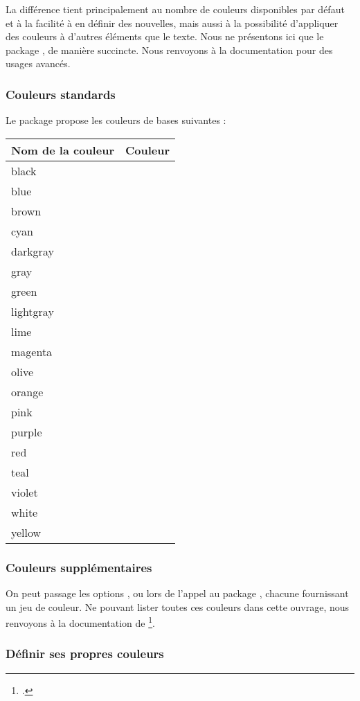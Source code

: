 La différence tient principalement au nombre de couleurs disponibles par défaut et à la facilité à en définir des nouvelles, mais aussi à la possibilité d'appliquer des couleurs à d'autres éléments que le texte. Nous ne présentons ici que le package , de manière succincte. Nous renvoyons à la documentation pour des usages avancés.

\subsubsection{Couleurs standards}
Le package  propose les couleurs de bases suivantes : 

\newcommand{\exemplecouleur}[1]{#1 & \fcolorbox{black}{#1}{~} \\}

\begin{longtable}{|l|l|}
    \hline
    Nom de la couleur         & Couleur                                 \\
    \hline
    \endhead
    \hline
    \endfoot
    \exemplecouleur{black}
    \exemplecouleur{blue}
    \exemplecouleur{brown}
    \exemplecouleur{cyan}
    \exemplecouleur{darkgray}
    \exemplecouleur{gray}
    \exemplecouleur{green}
    \exemplecouleur{lightgray}
    \exemplecouleur{lime}
    \exemplecouleur{magenta}
    \exemplecouleur{olive}
    \exemplecouleur{orange}
    \exemplecouleur{pink}
    \exemplecouleur{purple}
    \exemplecouleur{red}
    \exemplecouleur{teal}
    \exemplecouleur{violet}
    \exemplecouleur{white}
    \exemplecouleur{yellow}
    
\end{longtable}

\subsubsection{Couleurs supplémentaires}

On peut passage les options ,  ou  lors de l'appel au package , chacune fournissant un jeu de couleur. Ne pouvant lister toutes ces couleurs dans cette ouvrage, nous renvoyons à la documentation de \footcite{xcolor_jeu}.

\subsubsection{Définir ses propres couleurs}


